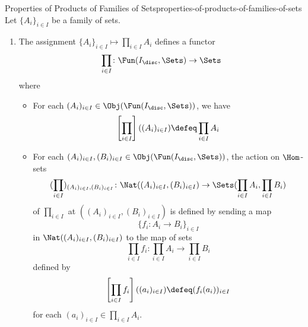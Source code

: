 \begin{proposition}{Properties of Products of Families of Sets}{properties-of-products-of-families-of-sets}%
    Let $\{A_{i}\}_{i\in I}$ be a family of sets.%
    \begin{enumerate}
        \item\label{properties-of-products-of-families-of-sets-functoriality}The assignment $\{A_{i}\}_{i\in I}\mapsto\prod_{i\in I}A_{i}$ defines a functor
            \[
                \prod_{i\in I}%
                \colon%
                \Fun(I_{\disc},\Sets)%
                \to%
                \Sets%
            \]%
            where
            \begin{itemize}
                \item{}For each $(A_{i})_{i\in I}\in\Obj(\Fun(I_{\disc},\Sets))$, we have
                    \[
                        \left[\prod_{i\in I}\right]((A_{i})_{i\in I})%
                        \defeq%
                        \prod_{i\in I}A_{i}%
                    \]%
                \item{}For each $(A_{i})_{i\in I},(B_{i})_{i\in I}\in\Obj(\Fun(I_{\disc},\Sets))$, the action on $\Hom$-sets
                    \[
                        (\prod_{i\in I})_{(A_{i})_{i\in I},(B_{i})_{i\in I}}
                        \colon
                        \Nat((A_{i})_{i\in I},(B_{i})_{i\in I})%
                        \to%
                        \Sets(\prod_{i\in I}A_{i},\prod_{i\in I}B_{i})%
                    \]%
                    of $\prod_{i\in I}$ at $((A_{i})_{i\in I},(B_{i})_{i\in I})$ is defined by sending a map
                    \[
                        \{%
                            f_{i}%
                            \colon%
                            A_{i}%
                            \to%
                            B_{i}
                        \}_{i\in I}%
                    \]%
                    in $\Nat((A_{i})_{i\in I},(B_{i})_{i\in I})$ to the map of sets
                    \[
                        \prod_{i\in I}f_{i}%
                        \colon
                        \prod_{i\in I}A_{i}%
                        \to%
                        \prod_{i\in I}B_{i}%
                    \]%
                    defined by
                    \[
                        \left[\prod_{i\in I}f_{i}\right]((a_{i})_{i\in I})
                        \defeq%
                        (f_{i}(a_{i}))_{i\in I}
                    \]%
                    for each $(a_{i})_{i\in I}\in\prod_{i\in I}A_{i}$.
            \end{itemize}
    \end{enumerate}
\end{proposition}

